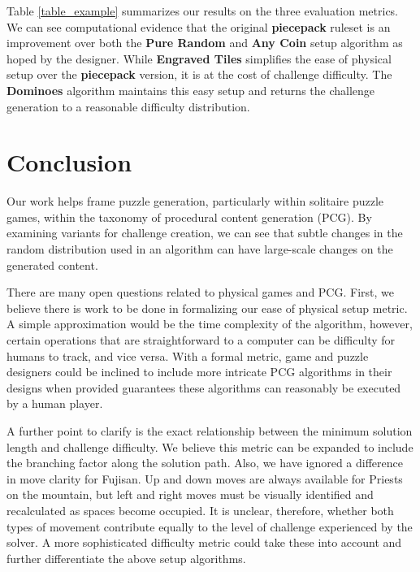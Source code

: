 \documentclass[10pt,journal,compsoc]{IEEEtran}
\begin{document}
Table \ref{table_example} summarizes our results on the three evaluation metrics. We can see computational evidence that the original {\bf piecepack} ruleset is an improvement over both the {\bf Pure Random} and {\bf Any Coin} setup algorithm as hoped by the designer. While {\bf Engraved Tiles} simplifies the ease of physical setup over the {\bf piecepack} version, it is at the cost of challenge difficulty. The {\bf Dominoes} algorithm maintains this easy setup and returns the challenge generation to a reasonable difficulty distribution.



\section{Conclusion}   \label{sec:Conclusion}

\noindent
Our work helps frame puzzle generation, particularly within solitaire puzzle games, within the taxonomy of procedural content generation (PCG). By examining variants for challenge creation, we can see that subtle changes in the random distribution used in an algorithm can have large-scale changes on the generated content.

There are many open questions related to physical games and PCG. First, we believe there is work to be done in formalizing our ease of physical setup metric. A simple approximation would be the time complexity of the algorithm, however, certain operations that are straightforward to a computer can be difficulty for humans to track, and vice versa. With a formal metric, game and puzzle designers could be inclined to include more intricate PCG algorithms in their designs when provided guarantees these algorithms can reasonably be executed by a human player.

A further point to clarify is the exact relationship between the minimum solution length and challenge difficulty. We believe this metric can be expanded to include the branching factor along the solution path. Also, we have ignored a difference in move clarity for Fujisan. Up and down moves are always available for Priests on the mountain, but left and right moves must be visually identified and recalculated as spaces become occupied. It is unclear, therefore, whether both types of movement contribute equally to the level of challenge experienced by the solver. A more sophisticated difficulty metric could take these into account and further differentiate the above setup algorithms.
\end{document}
